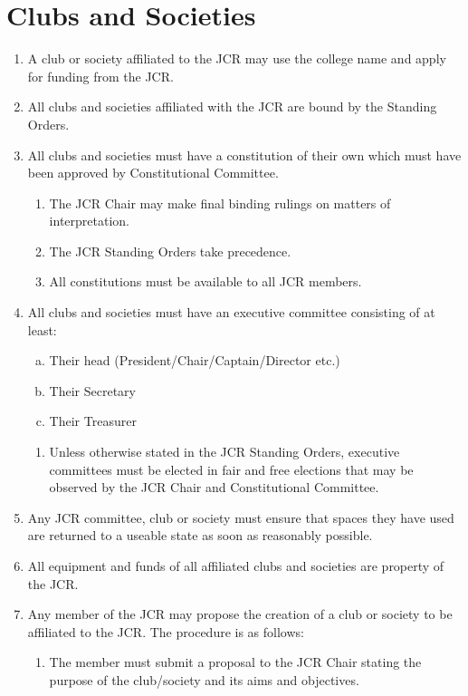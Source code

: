 \documentclass[12pt]{article}
\begin{document}
\section{Clubs and Societies}
\begin{enumerate}
    \item A club or society affiliated to the JCR may use the college name and apply for funding from the JCR.
    \item All clubs and societies affiliated with the JCR are bound by the Standing Orders.
    \item All clubs and societies must have a constitution of their own which must have been approved by Constitutional Committee.
    \begin{enumerate}
        \item The JCR Chair may make final binding rulings on matters of interpretation.
        \item The JCR Standing Orders take precedence.
        \item All constitutions must be available to all JCR members.
    \end{enumerate}
    \item All clubs and societies must have an executive committee consisting of at least:
    \begin{enumerate}[(a)]
        \item Their head (President/Chair/Captain/Director etc.)
        \item Their Secretary
        \item Their Treasurer
    \end{enumerate}
    \begin{enumerate}
        \item Unless otherwise stated in the JCR Standing Orders, executive committees must be elected in fair and free elections that may be observed by the JCR Chair and Constitutional Committee.
    \end{enumerate}
    \item Any JCR committee, club or society must ensure that spaces they have used are returned to a useable state as soon as reasonably possible.
    \item All equipment and funds of all affiliated clubs and societies are property of the JCR.
    \item Any member of the JCR may propose the creation of a club or society to be affiliated to the JCR. The procedure is as follows:
    \begin{enumerate}
        \item The member must submit a proposal to the JCR Chair stating the purpose of the club/society and its aims and objectives.

\end{enumerate}
\end{enumerate}
\end{document}
